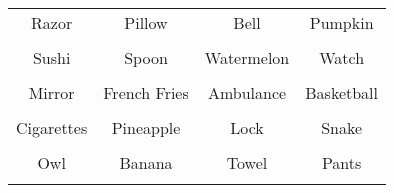 \documentclass[12pt,a4paper]{article}
\begin{document}
\thispagestyle{empty}
\begin{table}[]
\centering
\Huge
\begin{tabular}{cccc}
 Razor& Pillow& Bell& Pumpkin\\  & & & \\
 Sushi& Spoon& Watermelon& Watch\\  & & & \\
 Mirror& French Fries& Ambulance& Basketball\\  & & & \\
 Cigarettes& Pineapple& Lock& Snake\\  & & & \\
 Owl& Banana& Towel& Pants\\  & & & \\
\end{tabular}
\end{table}
\end{document}
